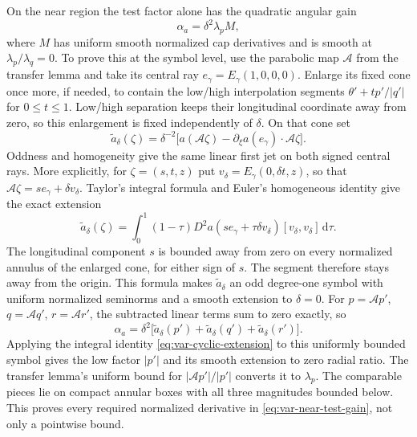 \documentclass[11pt,a4paper]{article}
\numberwithin{equation}{section}
\newcommand{\dd}{\mathrm d}
\theoremstyle{definition}
\begin{document}
On the near region the test factor alone has the quadratic angular
gain
\begin{equation}\label{eq:var-near-test-gain}
\alpha_a=\delta^2\lambda_p M,
\end{equation}
where $M$ has uniform smooth normalized cap derivatives and is smooth
at $\lambda_p/\lambda_q=0$. To prove this at the symbol level, use the parabolic map
$\mathcal A$ from the transfer lemma and take its central ray
$e_\gamma=E_\gamma(1,0,0,0)$. Enlarge its fixed cone once more, if
needed, to contain the low/high interpolation segments
$\theta'+t p'/|q'|$ for $0\leq t\leq1$. Low/high separation keeps their
longitudinal coordinate away from zero, so this enlargement is fixed
independently of $\delta$. On that cone set
\begin{equation*}
\widetilde a_\delta(\zeta)=\delta^{-2}
 \bigl[a(\mathcal A\zeta)-\partial_\xi a(e_\gamma)\cdot\mathcal A\zeta\bigr].
\end{equation*}
Oddness and homogeneity give the same linear first jet on both signed
central rays. More explicitly, for $\zeta=(s,t,z)$ put
$v_\delta=E_\gamma(0,\delta t,z)$, so that
$\mathcal A\zeta=s e_\gamma+\delta v_\delta$. Taylor's integral formula
and Euler's homogeneous identity give the exact extension
\begin{equation*}
\widetilde a_\delta(\zeta)
=\int_0^1(1-\tau)D^2a(s e_\gamma+\tau\delta v_\delta)
                         [v_\delta,v_\delta]\,\dd\tau.
\end{equation*}
The longitudinal component $s$ is bounded away from zero on every
normalized annulus of the enlarged cone, for either sign of $s$.
The segment therefore stays away from the origin. This formula makes
$\widetilde a_\delta$ an odd degree-one symbol with uniform normalized
seminorms and a smooth extension to $\delta=0$. For
$p=\mathcal A p'$, $q=\mathcal A q'$, $r=\mathcal A r'$,
the subtracted linear terms sum to zero exactly, so
\begin{equation*}
\alpha_a=\delta^2\bigl[
\widetilde a_\delta(p')+\widetilde a_\delta(q')
                         +\widetilde a_\delta(r')\bigr].
\end{equation*}
Applying the integral identity \eqref{eq:var-cyclic-extension} to
this uniformly bounded symbol gives the low factor $|p'|$ and its
smooth extension to zero radial ratio. The transfer lemma's uniform
bound for $|\mathcal A p'|/|p'|$ converts it to $\lambda_p$.
The comparable pieces lie on compact annular boxes with all three
magnitudes bounded below. This proves every required normalized
derivative in \eqref{eq:var-near-test-gain}, not only a pointwise bound.
\end{document}
